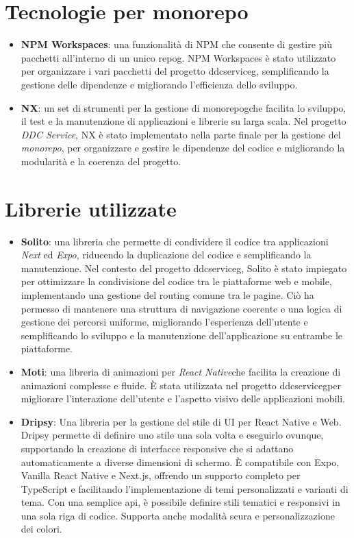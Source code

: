 \section{Tecnologie per monorepo}
\begin{itemize}
\item \textbf{NPM Workspaces}: una funzionalità di NPM che consente di gestire più pacchetti all'interno di un unico \gls{repog}\glox.
NPM Workspaces è stato utilizzato per organizzare i vari pacchetti del progetto \gls{ddcserviceg}\glox, semplificando la gestione delle dipendenze e migliorando l'efficienza dello sviluppo.
\item \textbf{NX}: un set di strumenti per la gestione di \gls{monorepog}\glox che facilita lo sviluppo, il test e la manutenzione di applicazioni e librerie su larga scala.
Nel progetto \textit{DDC Service}, NX è stato implementato nella parte finale per la gestione del \textit{monorepo}, per organizzare e gestire le dipendenze del codice e migliorando la modularità e la coerenza del progetto.
\end{itemize}

\section{Librerie utilizzate}
\begin{itemize}
    \item \textbf{Solito}: una libreria che permette di condividere il codice tra applicazioni \textit{Next} ed \textit{Expo}, riducendo la duplicazione del codice e semplificando la manutenzione.
    Nel contesto del progetto \gls{ddcserviceg}\glox, Solito è stato impiegato per ottimizzare la condivisione del codice tra le piattaforme web e mobile, implementando una gestione del routing comune tra le pagine.
    Ciò ha permesso di mantenere una struttura di navigazione coerente e una logica di gestione dei percorsi uniforme, migliorando l'esperienza dell'utente e semplificando lo sviluppo e la manutenzione dell'applicazione su entrambe le piattaforme.
    \item \textbf{Moti}: una libreria di animazioni per \textit{React Native}\glox\gloxspacing che facilita la creazione di animazioni complesse e fluide. È stata utilizzata nel progetto \gls{ddcserviceg}\glox per migliorare l'interazione dell'utente e l'aspetto visivo delle applicazioni mobili.
    \item \textbf{Dripsy}: Una libreria per la gestione del stile di UI per React Native e Web.
    Dripsy permette di definire uno stile una sola volta e eseguirlo ovunque, supportando la creazione di interfacce responsive che si adattano automaticamente a diverse dimensioni di schermo. È compatibile con Expo, Vanilla React Native e Next.js, offrendo un supporto completo per TypeScript e facilitando l'implementazione di temi personalizzati e varianti di tema.
    Con una semplice \gls{api}\glox, è possibile definire stili tematici e responsivi in una sola riga di codice. Supporta anche modalità scura e personalizzazione dei colori.
\end{itemize}

